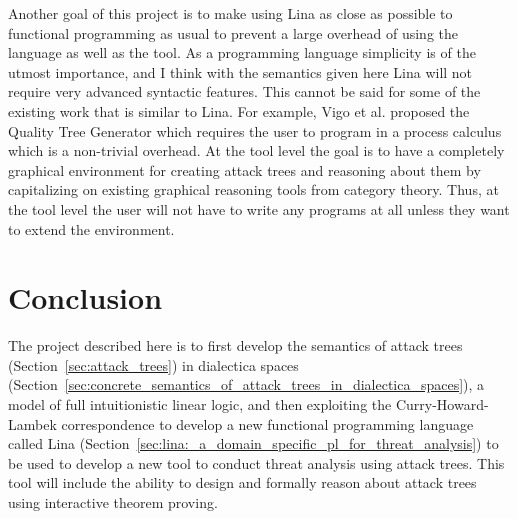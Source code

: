 \documentclass{sigplanconf}
\begin{document}
Another goal of this project is to make using Lina as close as
possible to functional programming as usual to prevent a large
overhead of using the language as well as the tool.  As a programming
language simplicity is of the utmost importance, and I think with the
semantics given here Lina will not require very advanced syntactic
features.  This cannot be said for some of the existing work that is
similar to Lina.  For example, Vigo et al. \cite{6957121} proposed the
Quality Tree Generator which requires the user to program in a process
calculus which is a non-trivial overhead. At the tool level the goal
is to have a completely graphical environment for creating attack
trees and reasoning about them by capitalizing on existing graphical
reasoning tools from category theory.  Thus, at the tool level the
user will not have to write any programs at all unless they want to
extend the environment.

\section{Conclusion}
\label{sec:conclusion}

The project described here is to first develop the semantics of attack
trees (Section~\ref{sec:attack_trees}) in dialectica spaces
(Section~\ref{sec:concrete_semantics_of_attack_trees_in_dialectica_spaces}),
a model of full intuitionistic linear logic, and then exploiting the
Curry-Howard-Lambek correspondence to develop a new functional
programming language called Lina
(Section~\ref{sec:lina:_a_domain_specific_pl_for_threat_analysis}) to
be used to develop a new tool to conduct threat analysis using attack
trees.  This tool will include the ability to design and formally
reason about attack trees using interactive theorem proving.


\end{document}
